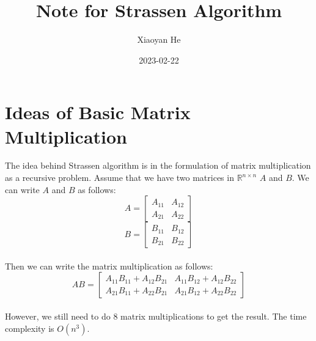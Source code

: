 \documentclass{article}
\title{Note for Strassen Algorithm}
\author{Xiaoyan He}
\date{2023-02-22}
\begin{document}
\maketitle

\section{Ideas of Basic Matrix Multiplication}
The idea behind Strassen algorithm is in the formulation
of matrix multiplication as a recursive problem.
Assume that we have two matrices in $\mathbb{R}^{n \times n}$  $A$ and $B$. We can write $A$ and $B$ as follows:
\begin{equation}
A = \begin{bmatrix}
A_{11} & A_{12} \\
A_{21} & A_{22}
\end{bmatrix}
\end{equation}
\begin{equation}
B = \begin{bmatrix}
B_{11} & B_{12} \\
B_{21} & B_{22}
\end{bmatrix}
\end{equation}\\
Then we can write the matrix multiplication as follows:
\begin{equation}
AB = \begin{bmatrix}
A_{11}B_{11} + A_{12}B_{21} & A_{11}B_{12} + A_{12}B_{22} \\
A_{21}B_{11} + A_{22}B_{21} & A_{21}B_{12} + A_{22}B_{22}
\end{bmatrix}
\end{equation}\\
However, we still need to do $8$ matrix multiplications to get the result. The time complexity is $O(n^3)$.
\end{document}

